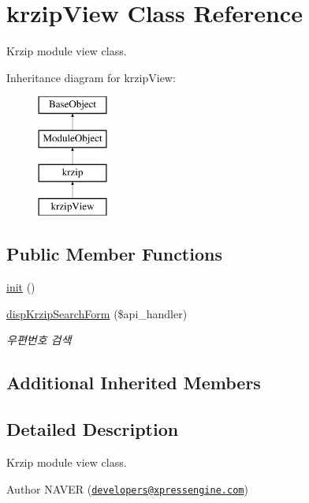 \hypertarget{classkrzipView}{\section{krzip\-View Class Reference}
\label{classkrzipView}
}


Krzip module view class.  


Inheritance diagram for krzip\-View\-:\begin{figure}[H]
\begin{center}
\leavevmode
\includegraphics[height=4.000000cm]{classkrzipView}
\end{center}
\end{figure}
\subsection*{Public Member Functions}
\begin{DoxyCompactItemize}
\item 
\hyperlink{classkrzipView_a2954cf98e50d18c0cffb9e2c19b5ba4e}{init} ()
\item 
\hyperlink{classkrzipView_a442f64f94bdb4e6aa12ec0f326f9090f}{disp\-Krzip\-Search\-Form} (\$api\-\_\-handler)
\begin{DoxyCompactList}\small\item\em 우편번호 검색 \end{DoxyCompactList}\end{DoxyCompactItemize}
\subsection*{Additional Inherited Members}


\subsection{Detailed Description}
Krzip module view class. 

\begin{DoxyAuthor}{Author}
N\-A\-V\-E\-R (\href{mailto:developers@xpressengine.com}{\tt developers@xpressengine.\-com}) 
\end{DoxyAuthor}


